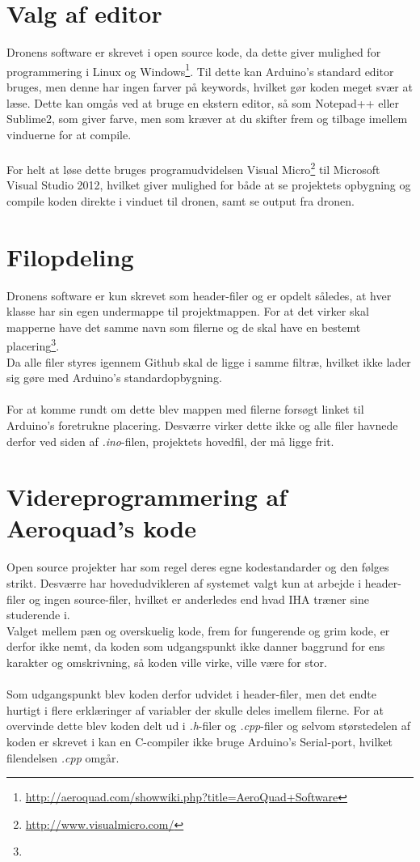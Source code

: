 \documentclass[Main]{subfiles}
\begin{document}
\section{Valg af editor}
Dronens software er skrevet i open source kode, da dette giver mulighed for programmering i Linux og Windows\footnote{\url{http://aeroquad.com/showwiki.php?title=AeroQuad+Software}}.
Til dette kan Arduino's standard editor bruges, men denne har ingen farver på keywords, hvilket gør koden meget svær at læse.
Dette kan omgås ved at bruge en ekstern editor, så som Notepad++ eller Sublime2, som giver farve, men som kræver at du skifter frem og tilbage imellem vinduerne for at compile.
\\
\\
For helt at løse dette bruges programudvidelsen Visual Micro\footnote{\url{http://www.visualmicro.com/}} til Microsoft Visual Studio 2012, hvilket giver mulighed for både at se projektets opbygning og compile koden direkte i vinduet til dronen, samt se output fra dronen.



\section{Filopdeling}
Dronens software er kun skrevet som header-filer og er opdelt således, at hver klasse har sin egen undermappe til projektmappen.
For at det virker skal mapperne have det samme navn som filerne og de skal have en bestemt placering\footnote{}.
\\
Da alle filer styres igennem Github skal de ligge i samme filtræ, hvilket ikke lader sig gøre med Arduino's standardopbygning.
\\
\\
For at komme rundt om dette blev mappen med filerne forsøgt linket til Arduino's foretrukne  placering.
Desværre virker dette ikke og alle filer havnede derfor ved siden af \textit{.ino}-filen, projektets hovedfil, der må ligge frit.


\section{Videreprogrammering af Aeroquad's kode}
Open source projekter har som regel deres egne kodestandarder og den følges strikt.
Desværre har hovedudvikleren af systemet valgt kun at arbejde i header-filer og ingen source-filer, hvilket er anderledes end hvad IHA træner sine studerende i.
\\
Valget mellem pæn og overskuelig kode, frem for fungerende og grim kode, er derfor ikke nemt, da koden som udgangspunkt ikke danner baggrund for ens karakter og omskrivning, så koden ville virke, ville være for stor.
\\
\\
Som udgangspunkt blev koden derfor udvidet i header-filer, men det endte hurtigt i flere erklæringer af variabler der skulle deles imellem filerne. 
For at overvinde dette blev koden delt ud i \textit{.h}-filer og \textit{.cpp}-filer og selvom størstedelen af koden er skrevet i  kan en C-compiler ikke bruge Arduino's Serial-port, hvilket filendelsen \textit{.cpp} omgår.
\end{document}

